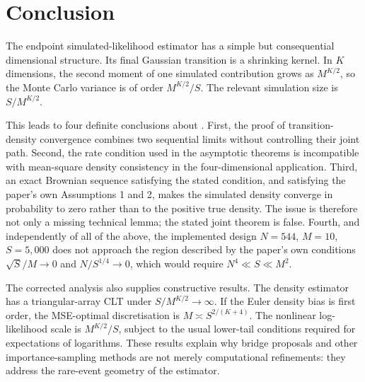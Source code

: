 \documentclass[11pt]{article}
\theoremstyle{definition}
\begin{document}
\section{Conclusion}

The endpoint simulated-likelihood estimator has a simple but consequential dimensional structure. Its final Gaussian transition is a shrinking kernel. In $K$ dimensions, the second moment of one simulated contribution grows as $M^{K/2}$, so the Monte Carlo variance is of order $M^{K/2}/S$. The relevant simulation size is $S/M^{K/2}$.

This leads to four definite conclusions about \citet{BrandtSantaClara2002}. First, the proof of transition-density convergence combines two sequential limits without controlling their joint path. Second, the rate condition used in the asymptotic theorems is incompatible with mean-square density consistency in the four-dimensional application. Third, an exact Brownian sequence satisfying the stated condition, and satisfying the paper's own Assumptions 1 and 2, makes the simulated density converge in probability to zero rather than to the positive true density. The issue is therefore not only a missing technical lemma; the stated joint theorem is false. Fourth, and independently of all of the above, the implemented design $N=544$, $M=10$, $S=5{,}000$ does not approach the region described by the paper's own conditions $\sqrt S/M\to0$ and $N/S^{1/4}\to0$, which would require $N^4\ll S\ll M^2$.

The corrected analysis also supplies constructive results. The density estimator has a triangular-array CLT under $S/M^{K/2}\to\infty$. If the Euler density bias is first order, the MSE-optimal discretisation is $M\asymp S^{2/(K+4)}$. The nonlinear log-likelihood scale is $M^{K/2}/S$, subject to the usual lower-tail conditions required for expectations of logarithms. These results explain why bridge proposals and other importance-sampling methods are not merely computational refinements: they address the rare-event geometry of the estimator.
\end{document}
